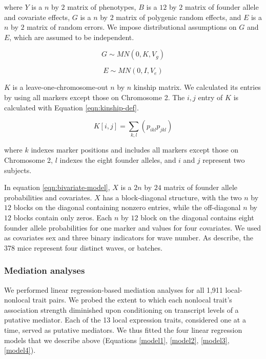 \documentclass{article}
\begin{document}
\begin{boehm}
where $Y$ is a $n$ by $2$ matrix of phenotypes, $B$ is a $12$ by $2$ matrix of founder allele and covariate effects, $G$ is a $n$ by $2$ matrix of polygenic random effects, and $E$ is a $n$ by $2$ matrix of random errors. We impose distributional assumptions on $G$ and $E$, which are assumed to be independent.

\begin{equation}
    G \sim MN(0, K, V_g)
\end{equation}

\begin{equation}
    E \sim MN(0, I, V_e)
\end{equation}

$K$ is a leave-one-chromosome-out $n$ by $n$ kinship matrix. We calculated its entries by using all markers except those on Chromosome 2. The $i, j$ entry of $K$ is calculated with Equation \ref{eqn:kinship-def}.

\begin{equation}
    K[i, j] = \sum_{k,l} (p_{ikl} p_{jkl})
    \label{eqn:kinship-def}
\end{equation}

where $k$ indexes marker positions and includes all markers except those on Chromosome 2, $l$ indexes the eight founder alleles, and $i$ and $j$ represent two subjects.

In equation \ref{eqn:bivariate-model}, $X$ is a $2n$ by $24$ matrix of founder allele probabilities and covariates. $X$ has a block-diagonal structure, with the two $n$ by $12$ blocks on the diagonal containing nonzero entries, while the off-diagonal $n$ by $12$ blocks contain only zeros. Each $n$ by $12$ block on the diagonal contains eight founder allele probabilities for one marker and values for four covariates. We used as covariates sex and three binary indicators for wave number. As \citet{keller2018genetic} describe, the 378 mice represent four distinct waves, or batches.

\subsubsection{Mediation analyses}

We performed linear regression-based mediation analyses for all 1,911 local-nonlocal trait pairs. We probed the extent to which each nonlocal trait's association strength diminished upon conditioning on transcript levels of a putative mediator. Each of the 13 local expression traits, considered one at a time, served as putative mediators. We thus fitted the four linear regression models that we describe above (Equations \ref{model1}, \ref{model2}, \ref{model3}, \ref{model4}).


\end{boehm}
\end{document}
